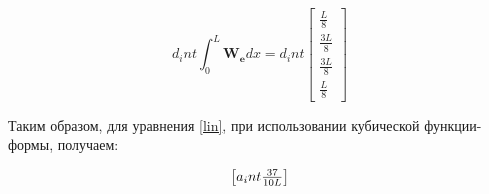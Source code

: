 {{{{$$
{{ d_int }} \int_0^L \mathbf{W_e} d x
=
{{ d_int }}
\begin{bmatrix}
	\frac{L}{8} \\
	\frac{3L}{8}\\
	\frac{3L}{8}\\
	\frac{L}{8}
\end{bmatrix}
$$

\newpage
Таким образом, для уравнения \ref{lin}, при использовании кубической функции-формы,  получаем:

\begin{align}\label{cub}
\begin{bmatrix}
    {{ a_int }} \frac{37}{10L} {%
	{%
}}
\end{bmatrix}
\end{align}}}}}
